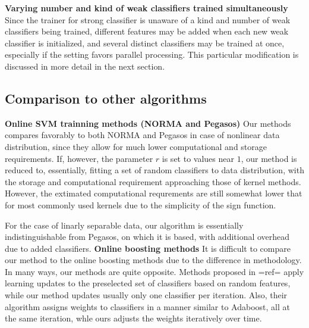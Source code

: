 {\bf Varying number and kind of weak classifiers trained simultaneously}  Since the trainer for strong classifier is unaware of a kind and number of weak classifiers being trained, different features may be added when each new weak classifier is initialized, and several distinct classifiers may be trained at once, especially if the setting favors parallel processing. 
This particular modification  is discussed in more detail in the next section.


\subsection{Comparison to other algorithms}
{\bf Online SVM trainning methods (NORMA and Pegasos)}
Our methods compares favorably to both NORMA and Pegasos in case of nonlinear data distribution, since they allow for much lower computational and storage requirements. If, however, the parameter $r$ is set to values near $1$, our method is reduced to, essentially, fitting a set of random classifiers to data distribution, with the storage and computational requirement approaching those of kernel methods. However, the extimated computational requrements are still somewhat lower that for most commonly used kernels due to the simplicity of the sign function. 

For the case of linarly separable data, our algorithm is essentially indistinguishable from Pegasos, on which it is based, with additional overhead due to added classifiers.
{\bf Online boosting methods}
It is difficult to compare our method to the online boosting methods due to the difference in methodology. In many ways, our methods are quite opposite. Methods proposed in {{=ref=}} apply learning updates to the preselected set of classifiers based on random features, while our method updates usually only one classifier per iteration. Also, their algorithm assigns weights to classifiers in a manner similar to Adaboost, all at the same iteration, whle ours adjusts the weights iteratively over time. 



\ifpdf
    \graphicspath{{X/figures/PNG/}{X/figures/PDF/}{X/figures/}}
\else
    \graphicspath{{X/figures/EPS/}{X/figures/}}
\fi









